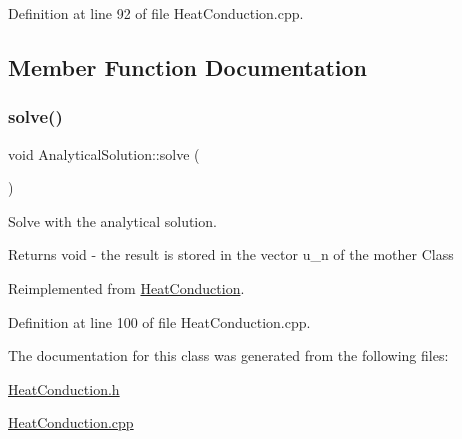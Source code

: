 Definition at line 92 of file Heat\+Conduction.\+cpp.



\subsection{Member Function Documentation}
\mbox{\label{class_analytical_solution_afd1d8d955abbe0c5b7763544faad8dd2}} 
\subsubsection{\texorpdfstring{solve()}{solve()}}
{\footnotesize\ttfamily void Analytical\+Solution\+::solve (\begin{DoxyParamCaption}{ }\end{DoxyParamCaption})\hspace{0.3cm}{\ttfamily [virtual]}}



Solve with the analytical solution. 

\begin{DoxyReturn}{Returns}
void -\/ the result is stored in the vector u\+\_\+n of the mother Class 
\end{DoxyReturn}


Reimplemented from \hyperlink{class_heat_conduction_ac176ea1a94c2fdb0da017b987ea22d1c}{Heat\+Conduction}.



Definition at line 100 of file Heat\+Conduction.\+cpp.



The documentation for this class was generated from the following files\+:\begin{DoxyCompactItemize}
\item 
\hyperlink{_heat_conduction_8h}{Heat\+Conduction.\+h}\item 
\hyperlink{_heat_conduction_8cpp}{Heat\+Conduction.\+cpp}\end{DoxyCompactItemize}
